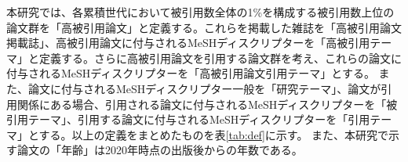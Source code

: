 本研究では、各累積世代において被引用数全体の1\%を構成する被引用数上位の論文群を「高被引用論文」と定義する。これらを掲載した雑誌を「高被引用論文掲載誌」、高被引用論文に付与されるMeSHディスクリプターを「高被引用テーマ」と定義する。さらに高被引用論文を引用する論文群を考え、これらの論文に付与されるMeSHディスクリプターを「高被引用論文引用テーマ」とする。
また、論文に付与されるMeSHディスクリプター一般を「研究テーマ」、論文が引用関係にある場合、引用される論文に付与されるMeSHディスクリプターを「被引用テーマ」、引用する論文に付与されるMeSHディスクリプターを「引用テーマ」とする。以上の定義をまとめたものを表\ref{tab:def}に示す。
また、本研究で示す論文の「年齢」は2020年時点の出版後からの年数である。
